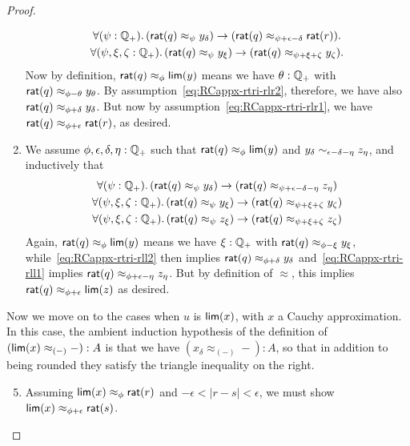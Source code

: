 \begin{proof}
\begin{enumerate}
    \begin{gather}
      \fall{\psi:\Qp}(\rcrat(q) \approx_{\psi} y_\delta) \to (\rcrat(q) \approx_{\psi+\epsilon-\delta} \rcrat(r)).\label{eq:RCappx-rtri-rlr1}\\
      \fall{\psi,\xi,\zeta:\Qp} (\rcrat(q) \approx_{\psi} y_\xi) \to (\rcrat(q) \approx_{\psi+\xi+\zeta} y_\zeta).\label{eq:RCappx-rtri-rlr2}
    \end{gather}
    Now by definition, $\mathsf{rat}(q)\approx_\phi \mathsf{lim}(y)$ means we have $\theta:\mathbb{Q}_{+}$ with $\mathsf{rat}(q) \approx_{\phi-\theta} y_\theta$.
    By assumption~\eqref{eq:RCappx-rtri-rlr2}, therefore, we have also $\mathsf{rat}(q) \approx_{\phi+\delta} y_\delta$.
    But now by assumption~\eqref{eq:RCappx-rtri-rlr1}, we have $\mathsf{rat}(q) \approx_{\phi+\epsilon} \mathsf{rat}(r)$, as desired.
  \item We assume $\phi,\epsilon,\delta,\eta:\mathbb{Q}_{+}$ such that $\mathsf{rat}(q)\approx_\phi \mathsf{lim}(y)$ and $y_\delta \sim_{\epsilon-\delta-\eta} z_\eta$, and inductively that 
    \begin{gather}
      \fall{\psi:\Qp}(\rcrat(q) \approx_{\psi} y_\delta) \to (\rcrat(q) \approx_{\psi+\epsilon-\delta-\eta} z_\eta)\label{eq:RCappx-rtri-rll1}\\
      \fall{\psi,\xi,\zeta:\Qp} (\rcrat(q) \approx_{\psi} y_\xi) \to (\rcrat(q) \approx_{\psi+\xi+\zeta} y_\zeta)\label{eq:RCappx-rtri-rll2}\\
      \fall{\psi,\xi,\zeta:\Qp} (\rcrat(q) \approx_{\psi} z_\xi) \to (\rcrat(q) \approx_{\psi+\xi+\zeta} z_\zeta)\label{eq:RCappx-rtri-rll3}
    \end{gather}
    Again, $\mathsf{rat}(q)\approx_\phi \mathsf{lim}(y)$ means we have $\xi:\mathbb{Q}_{+}$ with $\mathsf{rat}(q) \approx_{\phi-\xi} y_\xi$, while~\eqref{eq:RCappx-rtri-rll2} then implies $\mathsf{rat}(q) \approx_{\phi+\delta} y_\delta$ and~\eqref{eq:RCappx-rtri-rll1} implies $\mathsf{rat}(q) \approx_{\phi+\epsilon-\eta} z_\eta$.
    But by definition of $\approx$, this implies $\mathsf{rat}(q) \approx_{\phi+\epsilon} \mathsf{lim}(z)$ as desired.
  \end{enumerate}
  Now we move on to the cases when $u$ is $\mathsf{lim}(x)$, with $x$ a Cauchy approximation.
  In this case, the ambient induction hypothesis of the definition of $(\mathsf{lim}(x) \approx_{(-)} {-}) : A$ is that we have ${(x_\delta \approx_{(-)} {-})}: A$, so that in addition to being rounded they satisfy the triangle inequality on the right.
  \begin{enumerate}\setcounter{enumi}{4}
  \item Assuming $\mathsf{lim}(x)\approx_\phi \mathsf{rat}(r)$ and $-\epsilon<|r-s|<\epsilon$, we must show $\mathsf{lim}(x)\approx_{\phi+\epsilon} \mathsf{rat}(s)$.

\end{enumerate}
\end{proof}
